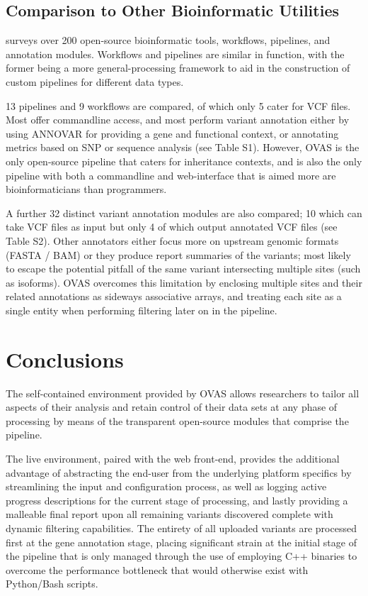 \documentclass[twocolumn]{bmcart}%
\def\app{OVAS}
\begin{document}
\enlargethispage{0.4cm}
\subsection{Comparison to Other Bioinformatic Utilities}

\citeauthor{pabinger2014survey} surveys over 200 open-source bioinformatic tools, workflows, pipelines, and annotation modules. Workflows and pipelines are similar in function, with the former being a more general-processing framework to aid in the construction of custom pipelines for different data types.

13 pipelines and 9 workflows are compared, of which only 5 cater for VCF files. Most offer commandline access, and most perform variant annotation either by using ANNOVAR \cite{wang2010annovar} for providing a gene and functional context, or annotating metrics based on SNP or sequence analysis (see Table S1). However, \app{} is the only open-source pipeline that caters for inheritance contexts, and is also the only pipeline with both a commandline and web-interface that is aimed more are bioinformaticians than programmers.

A further 32 distinct variant annotation modules are also compared; 10 which can take VCF files as input but only 4 of which output annotated VCF files (see Table S2). Other annotators either focus more on upstream genomic formats (FASTA / BAM) or they produce report summaries of the variants; most likely to escape the potential pitfall of the same  variant intersecting multiple sites (such as isoforms). \app{} overcomes this limitation by enclosing multiple sites and their related annotations as sideways associative arrays, and treating each site as a single entity when performing filtering later on in the pipeline. 




\section*{Conclusions}

The self-contained environment provided by \app{} allows researchers to tailor all aspects of their analysis and retain control of their data sets at any phase of processing by means of the transparent open-source modules that comprise the pipeline. 

The live environment, paired with the web front-end, provides the additional advantage of abstracting the end-user from the underlying platform specifics by streamlining the input and configuration process, as well as logging active progress descriptions for the current stage of processing, and lastly providing a malleable final report upon all remaining variants discovered complete with dynamic filtering capabilities. The entirety of all uploaded variants are processed first at the gene annotation stage, placing significant strain at the initial stage of the pipeline that is only managed through the use of employing C++ binaries to overcome the performance bottleneck that would otherwise exist with Python/Bash scripts.
\end{document}
